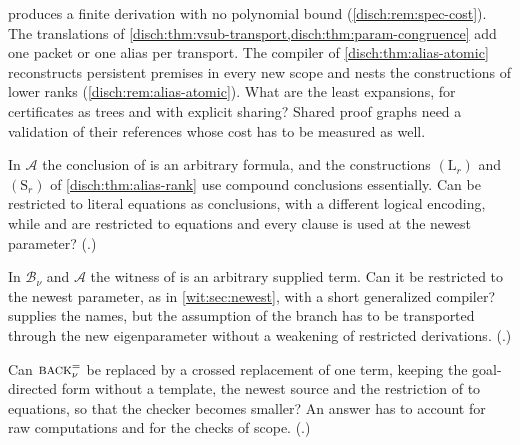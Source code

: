 \begin{question}
 produces a finite derivation with no polynomial
bound (\cref{disch:rem:spec-cost}). The translations of
\cref{disch:thm:vsub-transport,disch:thm:param-congruence} add one packet
or one alias per transport. The compiler of \cref{disch:thm:alias-atomic}
reconstructs persistent premises in every new scope and nests the
constructions of lower ranks (\cref{disch:rem:alias-atomic}). What are the
least expansions, for certificates as trees and with explicit sharing?
Shared proof graphs need a validation of their references whose cost has to
be measured as well.
\end{question}

\begin{question}
\label{disch:q:alias-open}
In $\mathcal A$ the conclusion of  is an arbitrary formula,
and the constructions $(\mathrm L_r)$ and $(\mathrm S_r)$ of
\cref{disch:thm:alias-rank} use compound conclusions essentially. Can
 be restricted to literal equations as conclusions, with a
different logical encoding, while  and  are
restricted to equations and every clause is used at the newest parameter?
(.)
\end{question}

\begin{question}
\label{disch:q:alias-witness}
In $\mathcal B_{\nu}$ and $\mathcal A$ the witness of  is
an arbitrary supplied term. Can it be restricted to the newest parameter,
as in \cref{wit:sec:newest}, with a short generalized compiler?
 supplies the names, but the assumption of the branch has
to be transported through the new eigenparameter without a weakening of
restricted derivations. (.)
\end{question}

\begin{question}
\label{disch:q:alias-crossed}
Can $\rulename{Back}^{=}_{\nu}$ be replaced by a crossed replacement of one
term, keeping the goal-directed form without a template, the newest source
and the restriction of  to equations, so that the checker
becomes smaller? An answer has to account for raw computations and for the
checks of scope. (.)
\end{question}

